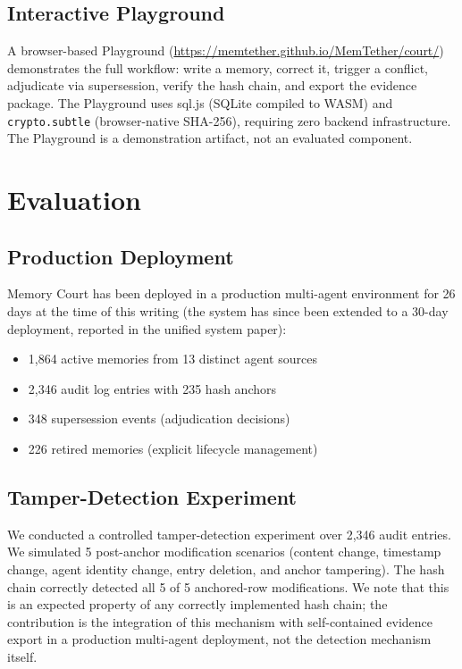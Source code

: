 \documentclass{article}
\begin{document}
\subsection{Interactive Playground}

A browser-based Playground (\url{https://memtether.github.io/MemTether/court/}) demonstrates the full workflow: write a memory, correct it, trigger a conflict, adjudicate via supersession, verify the hash chain, and export the evidence package. The Playground uses sql.js (SQLite compiled to WASM) and \texttt{crypto.subtle} (browser-native SHA-256), requiring zero backend infrastructure. The Playground is a demonstration artifact, not an evaluated component.

\section{Evaluation}

\subsection{Production Deployment}

Memory Court has been deployed in a production multi-agent environment for 26 days at the time of this writing (the system has since been extended to a 30-day deployment, reported in the unified system paper):
\begin{itemize}
\item 1{,}864 active memories from 13 distinct agent sources
\item 2{,}346 audit log entries with 235 hash anchors
\item 348 supersession events (adjudication decisions)
\item 226 retired memories (explicit lifecycle management)
\end{itemize}

\subsection{Tamper-Detection Experiment}

We conducted a controlled tamper-detection experiment over 2{,}346 audit entries. We simulated 5 post-anchor modification scenarios (content change, timestamp change, agent identity change, entry deletion, and anchor tampering). The hash chain correctly detected all 5 of 5 anchored-row modifications. We note that this is an expected property of any correctly implemented hash chain; the contribution is the integration of this mechanism with self-contained evidence export in a production multi-agent deployment, not the detection mechanism itself.
\end{document}
